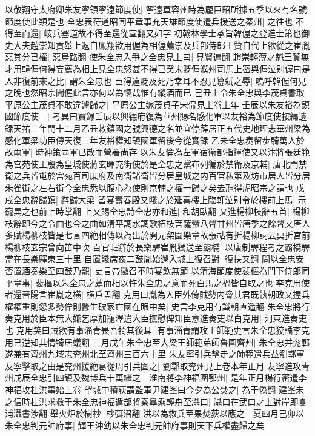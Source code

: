 以敬翔守太府卿朱友寧領寧遠節度使|{
	寧遠軍容州時為龎巨昭所據五季以來有名號節度使此類是也}
全忠表苻道昭同平章事充天雄節度使遣兵援送之秦州|{
	之往也}
不得至而還|{
	岐兵塞道故不得至還從宣翻又如字}
初翰林學士承旨韓偓之登進士第也御史大夫趙崇知貢舉上返自鳳翔欲用偓為相偓薦崇及兵部侍郎王贊自代上欲從之崔胤惡其分已權|{
	惡烏路翻}
使朱全忠入爭之全忠見上曰|{
	見賢遍翻}
趙崇輕薄之魁王贊無才用韓偓何得妄薦為相上見全忠怒甚不得已癸未貶偓濮州司馬上密與偓泣别偓曰是人非復前來之比|{
	謂朱全忠也}
臣得遠貶及死乃幸耳不忍見簒弑之辱|{
	嗚呼韓偓何見之晚也然昭宗聞偓此言亦何以為懷哉惟有縱酒而已}
己丑上令朱全忠與李茂貞書取平原公主茂貞不敢違遽歸之|{
	平原公主嫁茂貞子宋侃見上卷上年}
壬辰以朱友裕為鎮國節度使　|{
	考異曰實録壬辰以興德府復為華州賜名感化軍以友裕為節度使按編遺録天祐三年閏十二月乙丑敕鎮國之號興德之名並宜停薛居正五代史地理志華州梁為感化軍梁功臣傳天復三年友裕權知鎮國軍留後今從實録}
乙未全忠奏留步騎萬人於故兩軍|{
	時神策兩軍已散而營署尚存}
以朱友倫為左軍宿衛都指揮使又以汴將張廷範為宫苑使王殷為皇城使蔣玄暉充街使於是全忠之黨布列徧於禁衛及京輔|{
	唐北門禁衛之兵皆屯於宫苑百司庶府及南衙諸衛皆分居皇城之内百官私第及坊市居人皆分居朱雀街之左右街今全忠悉以腹心為使則京輔之權一歸之矣去虺得虎昭宗之謂也}
戊戌全忠辭歸鎮|{
	辭歸大梁}
留宴壽春殿又餞之於延喜樓上臨軒泣别令於樓前上馬|{
	示寵異之也前上時掌翻}
上又賜全忠詩全忠亦和進|{
	和胡臥翻}
又進楊柳枝辭五首|{
	楊柳枝辭即今之令曲也今之曲如清平調水調歌柘枝菩薩蠻八聲甘州皆唐季之餘聲又唐人多賦楊柳枝皆是七言四絶相傳以為出於開元棃園樂章故張祜有折楊柳詞云莫折宫前楊柳枝玄宗曾向笛中吹}
百官班辭於長樂驛崔胤獨送至霸橋|{
	以唐制驛程考之霸橋驛當在長樂驛東三十里}
自置餞席夜二鼓胤始還入城上復召對|{
	復扶又翻}
問以全忠安否置酒奏樂至四鼓乃罷|{
	史言帝徵召不時宴飲無節}
以清海節度使裴樞為門下侍郎同平章事|{
	裴樞以朱全忠之薦而相以忤朱全忠之意而死白馬之禍皆自取之也}
李克用使者還晉陽言崔胤之横|{
	横戶孟翻}
克用曰胤為人臣外倚賊勢内脅其君既執朝政又握兵權權重則怨多勢侔則釁生破家亡國在眼中矣|{
	史言李克用有識朝直遥翻}
朱全忠將行奏克用於臣本無大嫌乞厚加寵澤遣大臣撫慰俾知臣意進奏吏以白克用|{
	河東進奏吏也}
克用笑曰賊欲有事淄青畏吾犄其後耳|{
	有事淄青謂攻王師範史言朱全忠狡譎李克用已逆知其情犄居蟻翻}
三月戊午朱全忠至大梁王師範弟師魯圍齊州|{
	朱全忠并兖鄆遂兼有齊州九域志兖州北至齊州三百六十里}
朱友寧引兵擊走之師範遣兵益劉鄩軍友寧擊取之由是兖州援絶葛從周引兵圍之|{
	劉鄩取兖州見上卷本年正月}
友寧進攻青州戊辰全忠引四鎮及魏博兵十萬繼之　淮南將李神福圍鄂州|{
	是年正月楊行密遣李神福攻杜洪事始上卷}
望城中積荻謂監軍尹建峯曰今夕為公焚之|{
	為于偽翻}
建峯未之信時杜洪求救于朱全忠神福遣部將秦臯乘輕舟至灄口|{
	灄口在武口之上對岸即夏浦灄書涉翻}
舉火炬於樹杪|{
	杪弭沼翻}
洪以為救兵至果焚荻以應之　夏四月己卯以朱全忠判元帥府事|{
	輝王沖幼以朱全忠判元帥府事則天下兵權盡歸之矣}
